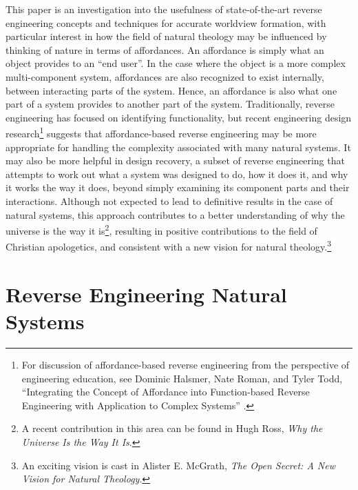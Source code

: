 This paper is an investigation into the usefulness of state-of-the-art
reverse engineering concepts and techniques for accurate worldview
formation, with particular interest in how the field of natural
theology may be influenced by thinking of nature in terms of
affordances. An affordance is simply what an object provides to an “end
user”. In the case where the object is a more complex multi-component
system, affordances are also recognized to exist internally, between
interacting parts of the system. Hence, an affordance is also what one
part of a system provides to another part of the system. Traditionally,
reverse engineering has focused on identifying functionality, but
recent engineering design research\citep[][pgs. 34--37]{maier2008}\footnote{
For
discussion of affordance-based reverse engineering from the perspective
of engineering education, see Dominic Halsmer, Nate Roman, and Tyler
Todd, “Integrating the Concept of Affordance into Function-based
Reverse Engineering with Application to Complex Systems” \citep{halsmeretal2009}.
} suggests that
affordance-based reverse engineering may be more appropriate for
handling the complexity associated with many natural systems. It may
also be more helpful in design recovery, a subset of reverse
engineering that attempts to work out what a system was designed to do,
how it does it, and why it works the way it does, beyond simply
examining its component parts and their interactions. Although not
expected to lead to definitive results in the case of natural systems,
this approach contributes to a better understanding of why the universe
is the way it is\footnote{
A recent contribution in this area can be found in
Hugh Ross, \textit{Why the Universe Is the Way It Is}.\citep{ross2008}
}, resulting in positive
contributions to the field of Christian apologetics, and consistent
with a new vision for natural theology.\footnote{
An exciting vision is cast in Alister E. McGrath,
\textit{The Open Secret: A New Vision for Natural Theology}.\citep{mcgrath2008}
}

\section{Reverse Engineering Natural Systems}

